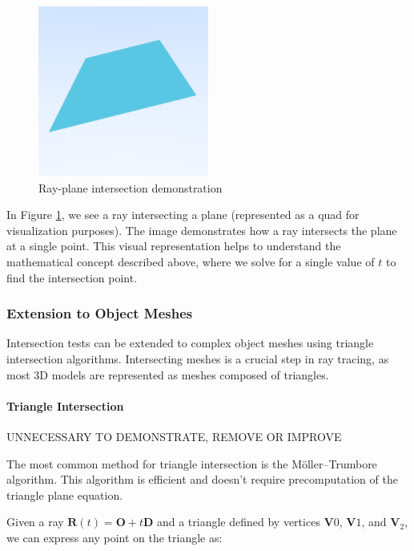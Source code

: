\documentclass[12pt]{article}
\begin{document}
\begin{figure}[H]
    \centering
    \includegraphics[width=0.5\textwidth]{images/intersections/ray_quad_intersection.png}
    \caption{Ray-plane intersection demonstration}
    \label{fig:rayplaneintersection}
\end{figure}

In Figure \ref{fig:rayplaneintersection}, we see a ray intersecting a plane (represented as a quad for visualization purposes). The image demonstrates how a ray intersects the plane at a single point. This visual representation helps to understand the mathematical concept described above, where we solve for a single value of \(t\) to find the intersection point.

\subsubsection{Extension to Object Meshes}

Intersection tests can be extended to complex object meshes using triangle intersection algorithms. Intersecting meshes is a crucial step in ray tracing, as most 3D models are represented as meshes composed of triangles.

\paragraph{Triangle Intersection}

UNNECESSARY TO DEMONSTRATE, REMOVE OR IMPROVE


The most common method for triangle intersection is the Möller–Trumbore algorithm. This algorithm is efficient and doesn't require precomputation of the triangle plane equation.

Given a ray \(\mathbf{R}(t) = \mathbf{O} + t\mathbf{D}\) and a triangle defined by vertices \(\mathbf{V}0\), \(\mathbf{V}1\), and \(\mathbf{V}_2\), we can express any point on the triangle as:
\end{document}
